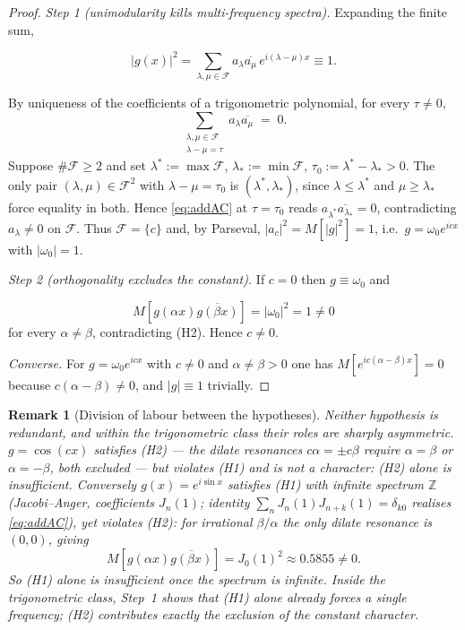 \documentclass[11pt]{article}
\newtheorem*{remark}{Remark}
\begin{document}
\begin{proof}
\emph{Step 1 (unimodularity kills multi-frequency spectra).}
Expanding the finite sum,

\[
|g(x)|^2 = \sum_{\lambda,\mu\in\mathcal{F}} a_\lambda \overline{a_\mu}\,
e^{i(\lambda-\mu)x} \equiv 1.
\]

By uniqueness of the coefficients of a trigonometric polynomial, for every
$\tau\neq 0$,
\begin{equation}\label{eq:addAC}
\sum_{\substack{\lambda,\mu\in\mathcal{F}\\ \lambda-\mu=\tau}}
a_\lambda \overline{a_\mu} \;=\; 0 .
\end{equation}
Suppose $\#\mathcal{F} \geq 2$ and set $\lambda^{*} := \max\mathcal{F}$,
$\lambda_{*} := \min\mathcal{F}$, $\tau_0 := \lambda^{*}-\lambda_{*} > 0$.
The only pair $(\lambda,\mu)\in\mathcal{F}^2$ with $\lambda-\mu=\tau_0$ is
$(\lambda^{*},\lambda_{*})$, since $\lambda \le \lambda^{*}$ and
$\mu \ge \lambda_{*}$ force equality in both. Hence \eqref{eq:addAC} at
$\tau=\tau_0$ reads $a_{\lambda^{*}}\overline{a_{\lambda_{*}}} = 0$,
contradicting $a_\lambda\neq 0$ on $\mathcal{F}$. Thus $\mathcal{F} = \{c\}$ and,
by Parseval, $|a_c|^2 = M[|g|^2] = 1$, i.e.\ $g = \omega_0 e^{icx}$ with
$|\omega_0|=1$.

\emph{Step 2 (orthogonality excludes the constant).}
If $c = 0$ then $g \equiv \omega_0$ and

\[
M[g(\alpha x)\overline{g(\beta x)}] = |\omega_0|^2 = 1 \neq 0
\]
 for every
$\alpha\neq\beta$, contradicting (H2). Hence $c\neq 0$.

\emph{Converse.} For $g = \omega_0 e^{icx}$ with $c\neq0$ and
$\alpha\neq\beta>0$ one has
$M[e^{ic(\alpha-\beta)x}] = 0$ because $c(\alpha-\beta)\neq 0$, and
$|g|\equiv 1$ trivially.
\end{proof}

\begin{remark}[Division of labour between the hypotheses]
Neither hypothesis is redundant, and within the trigonometric class their
roles are sharply asymmetric. $g=\cos(cx)$ satisfies (H2) --- the dilate
resonances $c\alpha=\pm c\beta$ require $\alpha=\beta$ or $\alpha=-\beta$,
both excluded --- but violates (H1) and is not a character: (H2) alone is
insufficient. Conversely $g(x)=e^{i\sin x}$ satisfies (H1) with infinite
spectrum $\mathbb{Z}$ (Jacobi--Anger, coefficients $J_n(1)$; identity
$\sum_n J_n(1)J_{n+k}(1)=\delta_{k0}$ realises \eqref{eq:addAC}), yet
violates (H2): for irrational $\beta/\alpha$ the only dilate resonance is
$(0,0)$, giving 
\[
M[g(\alpha x)\overline{g(\beta x)}] = J_0(1)^2 \approx
0.5855 \neq 0.
\]
 So (H1) alone is insufficient once the spectrum is
infinite. Inside the trigonometric class, Step~1 shows that (H1) alone
already forces a single frequency; (H2) contributes exactly the exclusion
of the constant character.
\end{remark}
\end{document}

